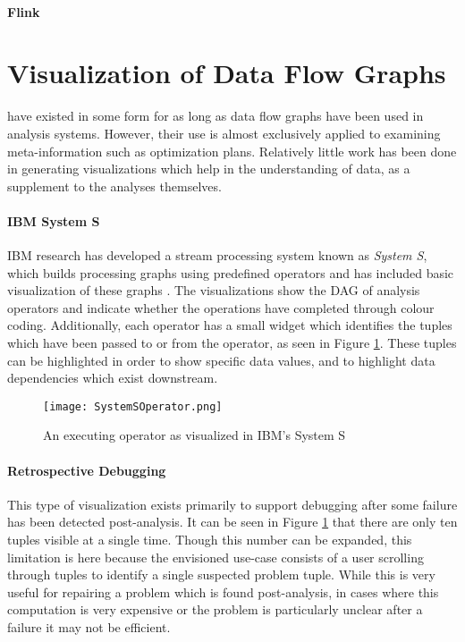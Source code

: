 \paragraph{Flink}

\section{Visualization of Data Flow Graphs}
\label{sec:dfgviz}

 have existed in some form for as long as data flow graphs have been used in analysis systems. However, their use is almost exclusively applied to examining meta-information such as optimization plans. Relatively little work has been done in generating visualizations which help in the understanding of data, as a supplement to the analyses themselves.

\paragraph{IBM System S}
IBM research has developed a stream processing system known as \emph{System S}, which builds processing graphs using predefined operators \cite{Gedik2008} and has included basic visualization of these graphs \cite{Pauw2010}. The visualizations show the DAG of analysis operators and indicate whether the operations have completed through colour coding. Additionally, each operator has a small widget which identifies the tuples which have been passed to or from the operator, as seen in Figure \ref{fig:systemsop}. These tuples can be highlighted in order to show specific data values, and to highlight data dependencies which exist downstream.

\begin{figure}
	\centering
	\label{fig:systemsop}
	\texttt{[image: SystemSOperator.png]}
	\caption{An executing operator as visualized in IBM's System S \cite{Pauw2010}}
\end{figure}

\paragraph{Retrospective Debugging}
This type of visualization exists primarily to support debugging after some failure has been detected post-analysis. It can be seen in Figure \ref{fig:systemsop} that there are only ten tuples visible at a single time. Though this number can be expanded, this limitation is here because the envisioned use-case consists of a user scrolling through tuples to identify a single suspected problem tuple. While this is very useful for repairing a problem which is found post-analysis, in cases where this computation is very expensive or the problem is particularly unclear after a failure it may not be efficient. 

